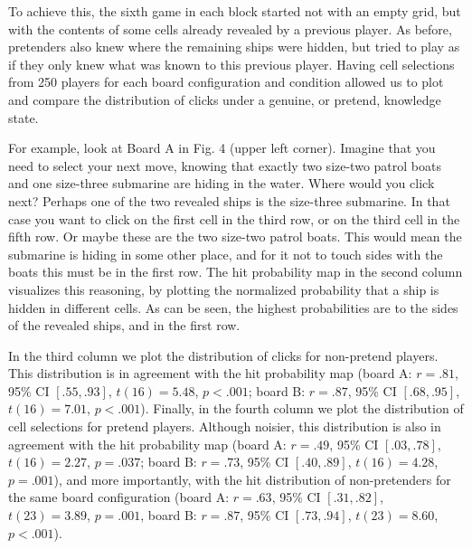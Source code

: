\documentclass[10pt, letterpaper]{article}
\begin{document}
To achieve this, the sixth game in each block started not with an empty
grid, but with the contents of some cells already revealed by a previous
player. As before, pretenders also knew where the remaining ships were
hidden, but tried to play as if they only knew what was known to this
previous player. Having cell selections from 250 players for each board
configuration and condition allowed us to plot and compare the
distribution of clicks under a genuine, or pretend, knowledge state.

For example, look at Board A in Fig. 4 (upper left corner). Imagine that
you need to select your next move, knowing that exactly two size-two
patrol boats and one size-three submarine are hiding in the water. Where
would you click next? Perhaps one of the two revealed ships is the
size-three submarine. In that case you want to click on the first cell
in the third row, or on the third cell in the fifth row. Or maybe these
are the two size-two patrol boats. This would mean the submarine is
hiding in some other place, and for it not to touch sides with the boats
this must be in the first row. The hit probability map in the second
column visualizes this reasoning, by plotting the normalized probability
that a ship is hidden in different cells. As can be seen, the highest
probabilities are to the sides of the revealed ships, and in the first
row.

In the third column we plot the distribution of clicks for non-pretend
players. This distribution is in agreement with the hit probability map
(board A: \(r = .81\), 95\% CI \([.55, .93]\), \(t(16) = 5.48\),
\(p < .001\); board B: \(r = .87\), 95\% CI \([.68, .95]\),
\(t(16) = 7.01\), \(p < .001\)). Finally, in the fourth column we plot
the distribution of cell selections for pretend players. Although
noisier, this distribution is also in agreement with the hit probability
map (board A: \(r = .49\), 95\% CI \([.03, .78]\), \(t(16) = 2.27\),
\(p = .037\); board B: \(r = .73\), 95\% CI \([.40, .89]\),
\(t(16) = 4.28\), \(p = .001\)), and more importantly, with the hit
distribution of non-pretenders for the same board configuration (board
A: \(r = .63\), 95\% CI \([.31, .82]\), \(t(23) = 3.89\), \(p = .001\),
board B: \(r = .87\), 95\% CI \([.73, .94]\), \(t(23) = 8.60\),
\(p < .001\)).
\end{document}
